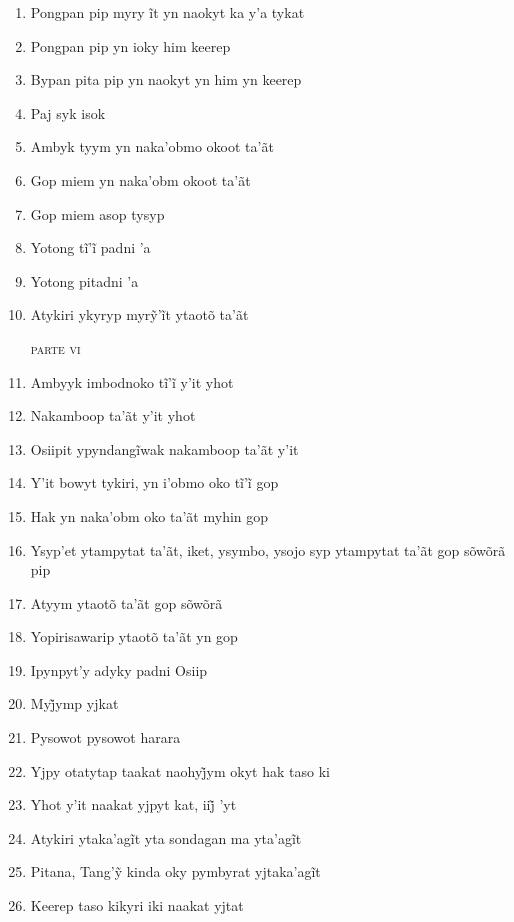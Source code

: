 \begin{enumerate}
 \item Pongpan pip myry ĩt yn naokyt ka y’a tykat
 \item Pongpan pip yn ioky him keerep
 \item Bypan pita pip yn naokyt yn him yn keerep
 \item Paj syk isok
 
 \begin{center}\end{center}
 
 \item Ambyk tyym yn naka'obmo okoot ta'ãt
 \item Gop miem yn naka'obm okoot ta'ãt
 \item Gop miem asop tysyp
 \item Yotong tĩ’ĩ padni ’a
 \item Yotong pitadni 'a
 \item Atykiri ykyryp myrỹ’ĩt ytaotõ ta’ãt
 
 \begin{flushright}\textsc{parte vi}\end{flushright}
 
 \item Ambyyk imbodnoko tĩ’ĩ y’it yhot
 \item Nakamboop ta'ãt y'it yhot
 \item Osiipit ypyndangĩwak nakamboop ta’ãt y’it
 \item Y’it bowyt tykiri, yn i’obmo oko tĩ’ĩ gop
 \item Hak yn naka'obm oko ta'ãt myhin gop
 \item Ysyp'et ytampytat ta'ãt, iket, ysymbo, ysojo syp ytampytat ta'ãt gop sõwõrã pip
 \item Atyym ytaotõ ta'ãt gop sõwõrã
 \item Yopirisawarip ytaotõ ta'ãt yn gop
 
 \begin{center}\end{center}
 
 \item Ipynpyt'y adyky padni Osiip
 \item Myj̃ymp yjkat
 \item Pysowot pysowot harara
 \item Yjpy otatytap taakat naohyj̃ym okyt hak taso ki
 \item Yhot y’it naakat yjpyt kat, iij̃ ’yt
 
 \begin{center}\end{center}
 
 \item Atykiri ytaka’agĩt yta sondagan ma yta’agĩt
 \item Pitana, Tang’ỹ kinda oky pymbyrat yjtaka’agĩt
 \item Keerep taso kikyri iki naakat yjtat
\end{enumerate}

